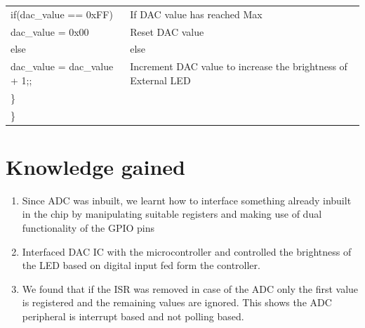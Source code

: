 \documentclass[12pt, letterpaper]{article}
\begin{document}
\begin{longtable}{|p{8cm}||p{6cm}|}
      
      \hspace{0.3cm} if(dac\_value == 0xFF) & If DAC value has reached Max\\
        \hspace{0.5cm}     dac\_value = 0x00 & Reset DAC value\\ 
        \hspace{0.3cm} else & else\\
        \hspace{0.5cm}    dac\_value = dac\_value + 1;; & Increment DAC value to increase the brightness of External LED\\
        \hspace{0.1cm} \} & \\

            \} & \\

\end{longtable}


\newpage

\section{Knowledge gained}

\begin{enumerate}
	\item Since ADC was inbuilt, we learnt how to interface something already inbuilt in the chip by manipulating suitable registers and making use of dual functionality of the GPIO pins
	
	\item Interfaced DAC IC with the microcontroller and controlled the brightness of the LED based on digital input fed form the controller.
	
	\item  We found that if the ISR was removed in case of the ADC only the first value is registered and the remaining values are ignored. This shows the ADC peripheral is interrupt based and not polling based. 
\end{enumerate}
\end{document}
